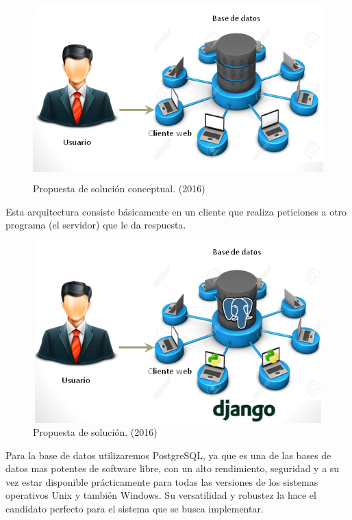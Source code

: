 \begin{figure}[H]
\begin{center}
	\includegraphics[width=13cm,height=7cm]{img/sin_tecnologia1.png}
\end{center}
\caption{Propuesta de solución conceptual. (2016)}
\label{fig:Sin_Tec}
\end{figure}

Esta arquitectura consiste básicamente en un cliente que realiza peticiones a otro programa (el servidor) que le da respuesta.

\begin{figure}[H]
\begin{center}
	\includegraphics[width=13cm,height=7cm]{img/con_tecnologia1.png}
\end{center}
\caption{Propuesta de solución. (2016)}
\label{fig:Con_Tec}
\end{figure}

Para la base de datos utilizaremos PostgreSQL, ya que es una de las bases de datos mas potentes de software libre, con un alto rendimiento, seguridad y a su vez estar disponible prácticamente para todas las versiones de los sistemas operativos Unix y también Windows. Su versatilidad y robustez la hace el candidato perfecto para el sistema que se busca implementar.

